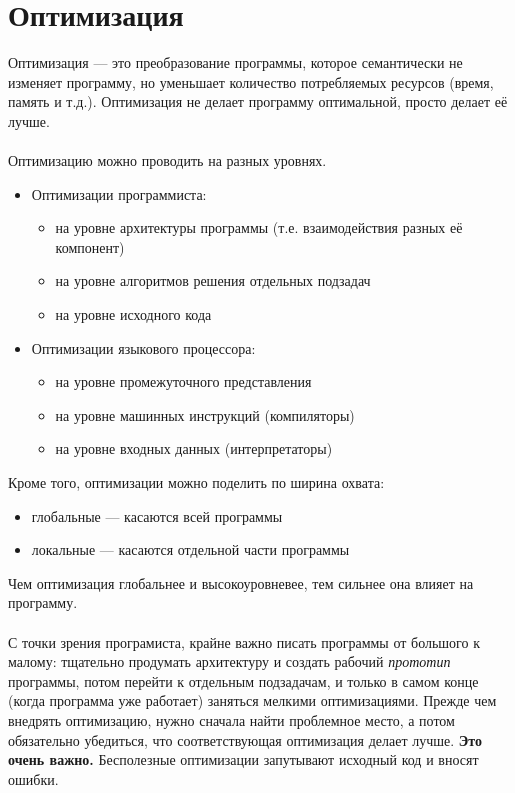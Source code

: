 \documentclass[11pt]{book}
\begin{document}
\section{Оптимизация}
Оптимизация --- это преобразование программы, которое семантически не изменяет программу,
но уменьшает количество потребляемых ресурсов (время, память и т.д.).
Оптимизация не делает программу оптимальной, просто делает её лучше.
\\ \\
Оптимизацию можно проводить на разных уровнях.
\begin{itemize}
\item Оптимизации программиста:
    \begin{itemize}
    \item на уровне архитектуры программы (т.е. взаимодействия разных её компонент)
    \item на уровне алгоритмов решения отдельных подзадач
    \item на уровне исходного кода
    \end{itemize}
\item Оптимизации языкового процессора:
    \begin{itemize}
    \item на уровне промежуточного представления
    \item на уровне машинных инструкций (компиляторы)
    \item на уровне входных данных (интерпретаторы)
    \end{itemize}
\end{itemize}
Кроме того, оптимизации можно поделить по ширина охвата:
\begin{itemize}
\item глобальные --- касаются всей программы
\item локальные --- касаются отдельной части программы
\end{itemize}
Чем оптимизация глобальнее и высокоуровневее, тем сильнее она влияет на программу.
\\ \\
С точки зрения програмиста, крайне важно писать программы от большого к малому:
тщательно продумать архитектуру и создать рабочий \emph{прототип} программы,
потом перейти к отдельным подзадачам,
и только в самом конце (когда программа уже работает) заняться мелкими оптимизациями.
Прежде чем внедрять оптимизацию, нужно сначала найти проблемное место,
а потом обязательно убедиться, что соответствующая оптимизация делает лучше.
\textbf{Это очень важно.}
Бесполезные оптимизации запутывают исходный код и вносят ошибки.
\end{document}
